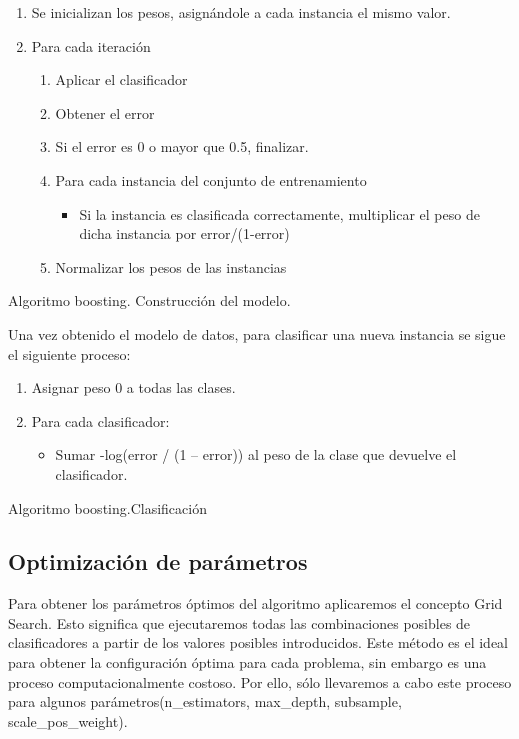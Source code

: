 \begin{algorithm}
	\begin{enumerate}
		\item Se inicializan los pesos, asignándole a cada instancia el mismo valor.
		\item Para cada iteración
		\begin{enumerate}
			\item Aplicar el clasificador 
			\item Obtener el error
			\item Si el error es 0 o mayor que 0.5, finalizar.
			\item Para cada instancia del conjunto de entrenamiento
			\begin{itemize}
				\item Si la instancia es clasificada correctamente, multiplicar el peso de dicha instancia por error/(1-error)
				
			\end{itemize}
			\item Normalizar los pesos de las instancias
		\end{enumerate}
	\end{enumerate}
	\caption{Algoritmo boosting. Construcción del modelo.}
\end{algorithm} 

Una vez obtenido el modelo de datos, para clasificar una nueva instancia se sigue el siguiente proceso:
\begin{algorithm}
	\begin{enumerate}
		\item Asignar peso 0 a todas las clases.
		\item Para cada clasificador:
		\begin{itemize}
			\item Sumar -log(error / (1 – error)) al peso de la clase que devuelve el clasificador.
		\end{itemize}
	\end{enumerate}
	\caption{Algoritmo boosting.Clasificación}
\end{algorithm}
\newpage
\subsection{Optimización de parámetros}
Para obtener los parámetros óptimos del algoritmo aplicaremos el concepto Grid
Search. Esto significa que ejecutaremos todas las combinaciones posibles de
clasificadores a partir de los valores posibles introducidos. Este método es el
ideal para obtener la configuración óptima para cada problema, sin embargo es
una proceso computacionalmente costoso. Por ello, sólo llevaremos a cabo este
proceso para algunos parámetros(n\_estimators, max\_depth, subsample,
scale\_pos\_weight).
\medskip

